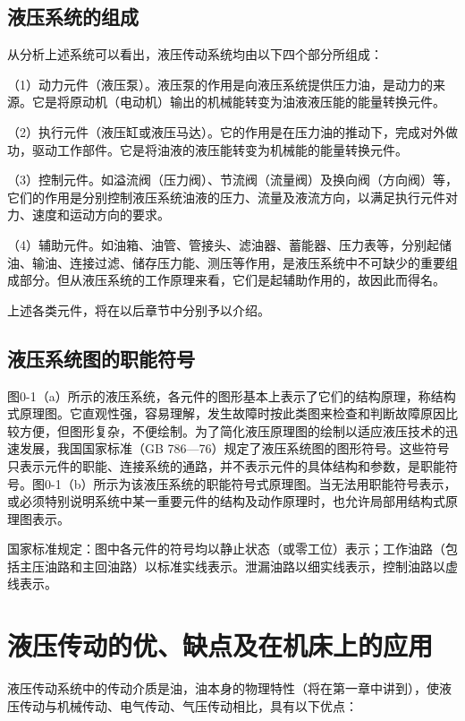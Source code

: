 \subsection{液压系统的组成}

    从分析上述系统可以看出，液压传动系统均由以下四个部分所组成：

    （1）动力元件（液压泵）。液压泵的作用是向液压系统提供压力油，是动力的来源。它是将原动机（电动机）输出的机械能转变为油液液压能的能量转换元件。

    （2）执行元件（液压缸或液压马达）。它的作用是在压力油的推动下，完成对外做功，驱动工作部件。它是将油液的液压能转变为机械能的能量转换元件。

    （3）控制元件。如溢流阀（压力阀）、节流阀（流量阀）及换向阀（方向阀）等，它们的作用是分别控制液压系统油液的压力、流量及液流方向，以满足执行元件对力、速度和运动方向的要求。

    （4）辅助元件。如油箱、油管、管接头、滤油器、蓄能器、压力表等，分别起储油、输油、连接过滤、储存压力能、测压等作用，是液压系统中不可缺少的重要组成部分。但从液压系统的工作原理来看，它们是起辅助作用的，故因此而得名。

    上述各类元件，将在以后章节中分别予以介绍。

\subsection{液压系统图的职能符号}

    图0-1（a）所示的液压系统，各元件的图形基本上表示了它们的结构原理，称结构式原理图。它直观性强，容易理解，发生故障时按此类图来检查和判断故障原因比较方便，但图形复杂，不便绘制。为了简化液压原理图的绘制以适应液压技术的迅速发展，我国国家标准（GB 786—76）规定了液压系统图的图形符号。这些符号只表示元件的职能、连接系统的通路，并不表示元件的具体结构和参数，是职能符号。图0-1（b）所示为该液压系统的职能符号式原理图。当无法用职能符号表示，或必须特别说明系统中某一重要元件的结构及动作原理时，也允许局部用结构式原理图表示。

    国家标准规定：图中各元件的符号均以静止状态（或零工位）表示；工作油路（包括主压油路和主回油路）以标准实线表示。泄漏油路以细实线表示，控制油路以虚线表示。

\section{液压传动的优、缺点及在机床上的应用}

    液压传动系统中的传动介质是油，油本身的物理特性（将在第一章中讲到），使液压传动与机械传动、电气传动、气压传动相比，具有以下优点：

